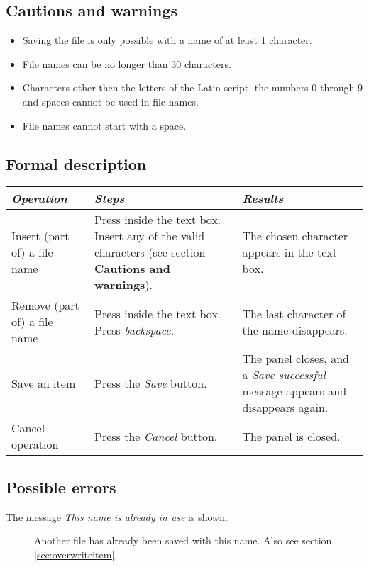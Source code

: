   \subsection*{Cautions and warnings}
  \begin{itemize}
  \item Saving the file is only possible with a name of at least 1 character.
  \item File names can be no longer than 30 characters.
  \item Characters other then the letters of the Latin script, the numbers 0 through 9 and spaces cannot be used in file names.
  \item File names cannot start with a space.
  \end{itemize}

  \subsection*{Formal description}
    \begin{tabularx}{\textwidth}{XXX}
    \toprule
    \emph{Operation} & \emph{Steps} & \emph{Results} \\
    \midrule
    Insert (part of) a file name & Press inside the text box. Insert any of the valid characters (see section \textbf{Cautions and warnings}). & The chosen character appears in the text box. \\
    \midrule
    Remove (part of) a file name & Press inside the text box. Press \emph{backspace}. & The last character of the name disappears. \\
    \midrule
    Save an item & Press the \emph{Save} button. & The panel closes, and a \emph{Save successful} message appears and disappears again. \\
    \midrule
    Cancel operation & Press the \emph{Cancel} button. & The panel is closed. \\
    \bottomrule
\end{tabularx}

  \subsection*{Possible errors}
  \begin{description}
  \item[The message \emph{This name is already in use} is shown.] Another file has already been saved with this name. Also see section \ref{sec:overwriteitem}.
  \end{description}


